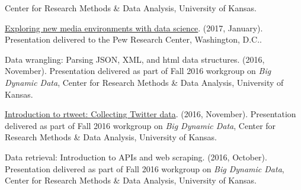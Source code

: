 \begin{bibenum}
      Center for Research Methods \& Data Analysis, University of Kansas.
    \item[]
      \href{https://mkearney.github.io/research_talk/pewtalk.html}{Exploring new media environments with data science}. (2017, January).
      Presentation delivered to the Pew Research Center, Washington, D.C..
    \item[] Data wrangling: Parsing JSON, XML, and html data structures. (2016, November).
      Presentation delivered as part of Fall 2016 workgroup on \textit{Big Dynamic Data},
      Center for Research Methods \& Data Analysis, University of Kansas.
    \item[]
      \href{https://github.com/mkearney/bigdata-workgroup}{Introduction to rtweet: Collecting Twitter data}. (2016, November).
      Presentation delivered as part of Fall 2016 workgroup on \textit{Big Dynamic Data},
      Center for Research Methods \& Data Analysis, University of Kansas.
    \item[] Data retrieval: Introduction to APIs and web scraping. (2016, October).
      Presentation delivered as part of Fall 2016 workgroup on \textit{Big Dynamic Data},
      Center for Research Methods \& Data Analysis, University of Kansas.
  \end{bibenum}
